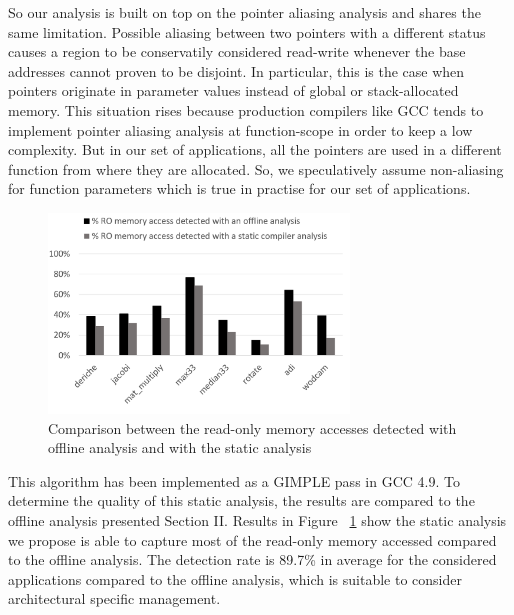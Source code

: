 \documentclass[sigconf]{acmart}
\begin{document}
So our analysis is built on top on the pointer aliasing analysis and shares the same limitation. Possible aliasing between two pointers with a different status causes a region to be conservatily considered read-write whenever the base addresses cannot proven to be disjoint. In particular, this is the case when pointers originate in parameter values instead of global or stack-allocated memory. This situation rises because production compilers like GCC tends to implement pointer aliasing analysis at function-scope in order to keep a low complexity. But in our set of applications, all the pointers are used in a different function from where they are allocated. So, we speculatively assume non-aliasing for function parameters which is true in practise for our set of applications.



\begin{figure}
    \centering
    \includegraphics[width=8cm]{./images/plugin_result.png}
    \caption{Comparison between the read-only memory accesses detected with offline analysis and with the static analysis}
    \label{comparAcces}
\end{figure}

This algorithm has been implemented as a GIMPLE pass in GCC 4.9. To determine the quality of this static analysis, the results are compared to the offline analysis presented Section II. Results in Figure ~\ref{comparAcces} show the static analysis we propose is able to capture most of the read-only memory accessed compared to the offline analysis. The detection rate is 89.7\% in average for the considered applications compared to the offline analysis, which is suitable to consider architectural specific management. 
\end{document}
